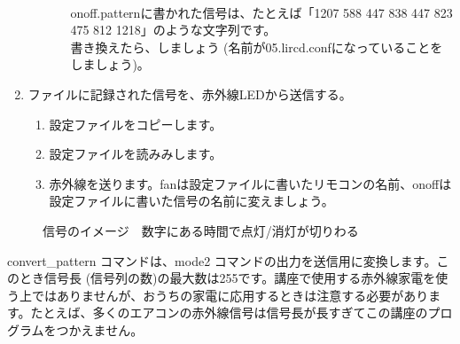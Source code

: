 \begin{enumerate}
\begin{enumerate}[1]
\begin{enumerate}[(1)]
\\onoff.patternに書かれた信号は、たとえば「1207 588 447 838 447 823 475 812 1218」のような文字列です。\\書き換えたら、しましょう (名前が05.lircd.confになっていることをしましょう)。
  \end{enumerate}
 \end{enumerate}
\item ファイルに記録された信号を、赤外線LEDから送信する。
 \begin{enumerate}[1]
  \item 設定ファイルをコピーします。 \\ 
  \item 設定ファイルを読みみします。\\ 
  \item 赤外線を送ります。fanは設定ファイルに書いたリモコンの名前、onoffは設定ファイルに書いた信号の名前に変えましょう。\\  
 \end{enumerate}
\end{enumerate}

\begin{figure}[H]
    \centering
 
    \caption{信号のイメージ　数字にある時間で点灯/消灯が切りわる}
\end{figure}

convert\_pattern コマンドは、mode2 コマンドの出力を送信用に変換します。このとき信号長 (信号列の数)の最大数は255です。講座で使用する赤外線家電を使う上ではありませんが、おうちの家電に応用するときは注意する必要があります。たとえば、多くのエアコンの赤外線信号は信号長が長すぎてこの講座のプログラムをつかえません。\\

\begin{tcolorbox}[title=\useOmetoi]
    \begin{enumerate}
    \end{enumerate}
    \end{tcolorbox}
